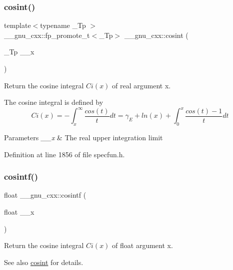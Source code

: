 \subsubsection{\texorpdfstring{cosint()}{cosint()}}
{\footnotesize\ttfamily template$<$typename \+\_\+\+Tp $>$ \\
\+\_\+\+\_\+gnu\+\_\+cxx\+::fp\+\_\+promote\+\_\+t$<$\+\_\+\+Tp$>$ \+\_\+\+\_\+gnu\+\_\+cxx\+::cosint (\begin{DoxyParamCaption}\item[{\+\_\+\+Tp}]{\+\_\+\+\_\+x }\end{DoxyParamCaption})\hspace{0.3cm}{\ttfamily [inline]}}

Return the cosine integral $ Ci(x) $ of real argument {\ttfamily x}.

The cosine integral is defined by \[ Ci(x) = -\int_x^\infty \frac{cos(t)}{t}dt = \gamma_E + ln(x) + \int_0^x \frac{cos(t)-1}{t}dt \]


\begin{DoxyParams}{Parameters}
{\em \+\_\+\+\_\+x} & The real upper integration limit \\
\hline
\end{DoxyParams}


Definition at line 1856 of file specfun.\+h.

\mbox{\label{group__mathsf__gnu_ga87202351dc97d2c69e42bf58f911fb5a}} 
\subsubsection{\texorpdfstring{cosintf()}{cosintf()}}
{\footnotesize\ttfamily float \+\_\+\+\_\+gnu\+\_\+cxx\+::cosintf (\begin{DoxyParamCaption}\item[{float}]{\+\_\+\+\_\+x }\end{DoxyParamCaption})\hspace{0.3cm}{\ttfamily [inline]}}

Return the cosine integral $ Ci(x) $ of {\ttfamily float} argument {\ttfamily x}.

\begin{DoxySeeAlso}{See also}
\hyperlink{group__mathsf__gnu_gafd398869cde057087e6b3428a1d13a93}{cosint} for details. 
\end{DoxySeeAlso}


